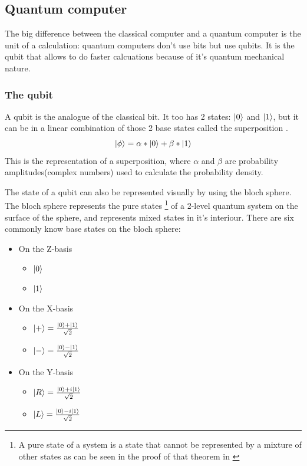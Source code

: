 \subsection{Quantum computer} \label{quantum computer}
The big difference between the classical computer and a quantum computer is the unit of a calculation: quantum computers don't use bits but use qubits.
It is the qubit that allows to do faster calcuations because of it's quantum mechanical nature.


\subsubsection{The qubit} \label{qubit}
A qubit is the analogue of the classical bit. It too has 2 states: $\ket{0}$ and $\ket{1}$, but it can be in a linear combination of those 2 base states called the superposition \autocite{thequbit}.
\begin{equation}
    \ket{\phi} = \alpha * \ket{0} + \beta * \ket{1}
\end{equation}
This is the representation of a superposition, where $\alpha$ and $\beta$ are probability amplitudes(complex numbers) used to calculate the probability density.


The state of a qubit can also be represented visually by using the bloch sphere. The bloch sphere represents the pure states \footnote{A pure state of a system is a state that cannot be represented by a mixture of other states as can be seen in the proof of that theorem in \textcite{Ballentine2014}} of a 2-level quantum system on the surface of the sphere, and represents mixed states in it's interiour.
There are six commonly know base states on the bloch sphere:

\begin{itemize}
    \item On the Z-basis
        \begin{itemize}
            \item $\ket{0}$
            \item $\ket{1}$
        \end{itemize}
    \item On the X-basis
        \begin{itemize}
            \item $\ket{+} = \frac{\ket{0} + \ket{1}}{\sqrt{2}}$
            \item $\ket{-} = \frac{\ket{0} - \ket{1}}{\sqrt{2}}$
        \end{itemize}
    \item On the Y-basis
        \begin{itemize}
            \item $\ket{R} = \frac{\ket{0} + i \ket{1}}{\sqrt{2}}$
            \item $\ket{L} = \frac{\ket{0} - i \ket{1}}{\sqrt{2}}$
        \end{itemize}
\end{itemize}

